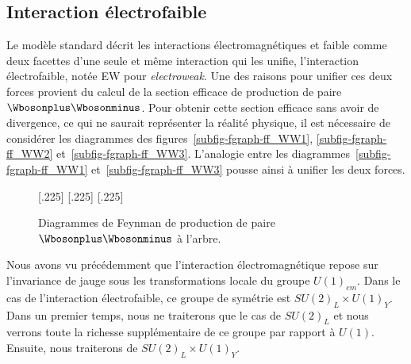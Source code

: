 \subsection{Interaction électrofaible}\label{chapter-MS-MSSM-section-formalisme-subsec-EW}
Le modèle standard décrit les interactions électromagnétiques et faible comme deux facettes d'une seule et même interaction qui les unifie, l'interaction électrofaible, notée \og EW \fg{} pour \emph{electroweak}.
Une des raisons pour unifier ces deux forces provient du calcul de la section efficace de production de paire $\Wbosonplus\Wbosonminus$. Pour obtenir cette section efficace sans avoir de divergence, ce qui ne saurait représenter la réalité physique, il est nécessaire de considérer les diagrammes des figures~\ref{subfig-fgraph-ff_WW1}, \ref{subfig-fgraph-ff_WW2} et~\ref{subfig-fgraph-ff_WW3}. L'analogie entre les diagrammes~\ref{subfig-fgraph-ff_WW1} et~\ref{subfig-fgraph-ff_WW3} pousse ainsi à unifier les deux forces.
\begin{figure}[h]
\centering
\vspace{\baselineskip}
\subcaptionbox{\label{subfig-fgraph-ff_WW1}}[.225\textwidth]
{\vspace{\baselineskip}}
\hfill
\subcaptionbox{\label{subfig-fgraph-ff_WW2}}[.225\textwidth]
{\vspace{\baselineskip}}
\hfill
\subcaptionbox{\label{subfig-fgraph-ff_WW3}}[.225\textwidth]
{\vspace{\baselineskip}}

\caption{Diagrammes de Feynman de production de paire $\Wbosonplus\Wbosonminus$ à l'arbre.}
\label{fig-fgraph-ff_WW}
\end{figure}
\par Nous avons vu précédemment que l'interaction électromagnétique repose sur l'invariance de jauge sous les transformations locale du groupe $U(1)_{em}$.
Dans le cas de l'interaction électrofaible, ce groupe de symétrie est $SU(2)_L \times U(1)_Y$. Dans un premier temps, nous ne traiterons que le cas de $SU(2)_L$ et nous verrons toute la richesse supplémentaire de ce groupe par rapport à $U(1)$. Ensuite, nous traiterons de $SU(2)_L \times U(1)_Y$.

